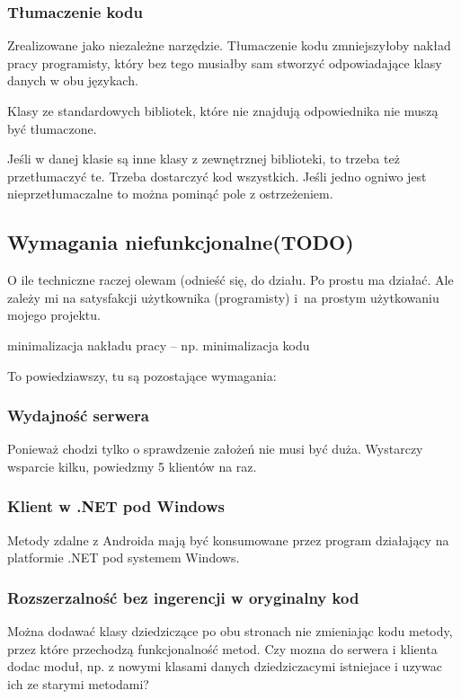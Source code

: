 \subsubsection{Tłumaczenie kodu}
Zrealizowane jako niezależne narzędzie.
Tłumaczenie kodu zmniejszyłoby nakład pracy programisty, który bez tego musiałby sam stworzyć odpowiadające klasy danych w obu językach.

Klasy ze standardowych bibliotek, które nie znajdują odpowiednika nie muszą być tłumaczone.

Jeśli w danej klasie są inne klasy z zewnętrznej biblioteki, to trzeba też przetłumaczyć te. Trzeba dostarczyć kod wszystkich.
Jeśli jedno ogniwo jest nieprzetłumaczalne to można pominąć pole z ostrzeżeniem.



\subsection{Wymagania niefunkcjonalne(TODO)}
O ile techniczne raczej olewam (odnieść się, do działu. Po prostu ma działać.
Ale zależy mi na satysfakcji użytkownika (programisty) i~na prostym użytkowaniu mojego projektu.

minimalizacja nakładu pracy -- np. minimalizacja kodu

To powiedziawszy, tu są pozostające wymagania:

\subsubsection{Wydajność serwera}
Ponieważ chodzi tylko o sprawdzenie założeń nie musi być duża. Wystarczy wsparcie kilku, powiedzmy 5 klientów na raz.

\subsubsection{Klient w .NET pod Windows}
Metody zdalne z Androida mają być konsumowane przez program działający na platformie .NET pod systemem Windows.

\subsubsection{Rozszerzalność bez ingerencji w oryginalny kod}
Można dodawać klasy dziedziczące po obu stronach nie zmieniając kodu metody, przez które przechodzą funkcjonalność metod.
Czy mozna do serwera i klienta dodac moduł, np.
z nowymi klasami danych dziedziczacymi istniejace
i uzywac ich ze starymi metodami?

